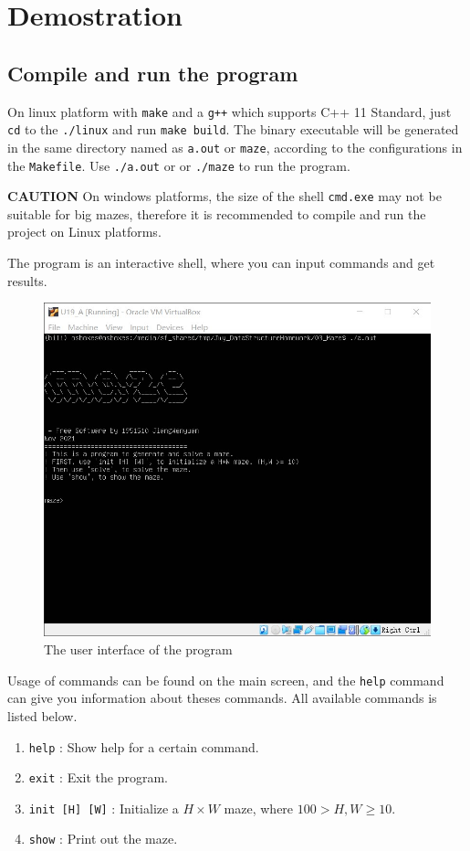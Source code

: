 \documentclass[cn,black,12pt,normal]{elegantnote}
\begin{document}
\section{Demostration}

\subsection{Compile and run the program}

On linux platform with \lstinline{make} and a \lstinline{g++} which supports C++ 11 Standard, just \lstinline{cd} to the \lstinline{./linux} and run \lstinline{make build}. The binary executable will be generated in the same directory named as \lstinline{a.out} or \lstinline{maze}, according to the configurations in the \lstinline{Makefile}. Use \lstinline{./a.out} or or \lstinline{./maze} to run the program.

\textbf{CAUTION} On windows platforms, the size of the shell \lstinline{cmd.exe} may not be suitable for big mazes, therefore it is recommended to compile and run the project on Linux platforms.

The program is an interactive shell, where you can input commands and get results.

\begin{figure}[H]
    \centering
    \includegraphics[width=0.7\linewidth]{image/m01.jpg}
    \caption{The user interface of the program}
\end{figure}

Usage of commands can be found on the main screen, and the \lstinline{help} command can give you information about theses commands.  All available commands is listed below.

\begin{enumerate}
    \item \lstinline{help} : Show help for a certain command.
    \item \lstinline{exit} : Exit the program.
    \item \lstinline{init [H] [W]} : Initialize a $H \times W$ maze, where $100 > H,W \geq 10$.
    \item \lstinline{show} : Print out the maze.
\end{enumerate}
\end{document}

